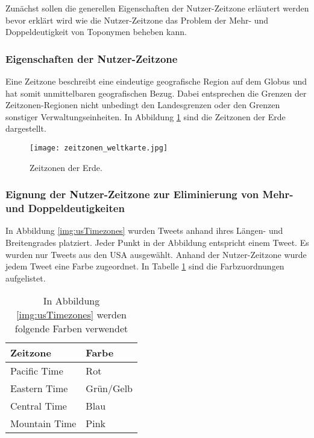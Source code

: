 				Zunächst sollen die generellen Eigenschaften der Nutzer-Zeitzone erläutert werden bevor erklärt wird wie die Nutzer-Zeitzone das Problem der Mehr- und Doppeldeutigkeit von Toponymen beheben kann.

				\subsubsection{Eigenschaften der Nutzer-Zeitzone}

					Eine Zeitzone beschreibt eine eindeutige geografische Region auf dem Globus und hat somit unmittelbaren geografischen Bezug.
					Dabei entsprechen die Grenzen der Zeitzonen-Regionen nicht unbedingt den Landesgrenzen oder den Grenzen sonstiger Verwaltungseinheiten. 
					In Abbildung \ref{img:timezones} sind die Zeitzonen der Erde dargestellt.

					\begin{figure}[!ht]
						\begin{center}
							\texttt{[image: zeitzonen\_weltkarte.jpg]}
							\caption{Zeitzonen der Erde.}
							\label{img:timezones}
						\end{center}
					\end{figure}	

				\subsubsection{Eignung der Nutzer-Zeitzone zur Eliminierung von Mehr- und Doppeldeutigkeiten}

					In Abbildung \ref{img:usTimezones} wurden Tweets anhand ihres Längen- und Breitengrades platziert.
					Jeder Punkt in der Abbildung entspricht einem Tweet.
					Es wurden nur Tweets aus den USA ausgewählt.
					Anhand der Nutzer-Zeitzone wurde jedem Tweet eine Farbe zugeordnet.
					In Tabelle \ref{tab:timezoneColors} sind die Farbzuordnungen aufgelistet. 

					\begin{table}[h]
					\centering
					\caption{In Abbildung \ref{img:usTimezones} werden folgende Farben verwendet}
					\label{tab:timezoneColors}
						\begin{tabular}{|l|l|}
							\hline
							Zeitzone      & Farbe     \\ \hline \hline
							Pacific Time  & Rot       \\ \hline
							Eastern Time  & Grün/Gelb \\ \hline
							Central Time  & Blau      \\ \hline
							Mountain Time & Pink      \\ \hline
						\end{tabular}
					\end{table}

